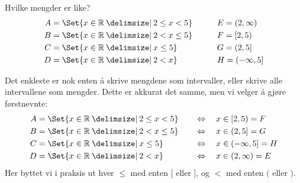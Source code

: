 \documentclass[a4paper,11pt]{article}
\begin{document}

\begin{problem}
  Hvilke mengder er like?
  \begin{alignat*}{2}
    A &= \Set{x\in\R\given2\leq x<5} \qquad && E=(2,\infty)\\
    B &= \Set{x\in\R\given2 < x\leq5}     && F=[2,5)\\
    C &= \Set{x\in\R\given x\leq5}          && G=(2,5]\\
    D &= \Set{x\in\R\given2<x}              && H=(-\infty,5]
  \end{alignat*}
\end{problem}

\begin{solution}
  Det enkleste er nok enten å skrive mengdene som intervaller, eller skrive alle
  intervallene som mengder. Dette er akkurat det samme, men vi velger å gjøre
  førstnevnte:
  \begin{alignat*}{2}
    A &= \Set{x\in\R\given2\leq x<5} \quad && \Leftrightarrow \quad x \in [2,5) = F\\
    B &= \Set{x\in\R\given2< x\leq5}       && \Leftrightarrow \quad x \in (2,5] = G \\
    C &= \Set{x\in\R\given x\leq5}         && \Leftrightarrow \quad x \in (-\infty,5] = H\\
    D &= \Set{x\in\R\given2<x}             && \Leftrightarrow \quad x \in (2,\infty) = E
  \end{alignat*}
  Her byttet vi i praksis ut hver $\leq$ med enten $[$ eller $]$, og $<$ med
  enten $($ eller $)$.
\end{solution}

\end{document}
